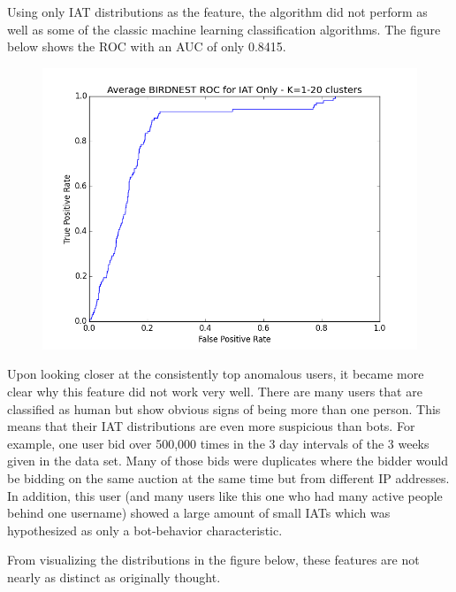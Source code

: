 \documentclass{article} %
\begin{document}
Using only IAT distributions as the feature, the algorithm did not perform as well as some of the classic machine learning classification algorithms.
The figure below shows the ROC with an AUC of only 0.8415.

\begin{figure}[h]
\centering
{\includegraphics[scale=0.47]{img/bird_iat_roc.png}}
\end{figure}

Upon looking closer at the consistently top anomalous users, it became more clear why this feature did not work very well.
There are many users that are classified as human but show obvious signs of being more than one person.
This means that their IAT distributions are even more suspicious than bots.
For example, one user bid over 500,000 times in the 3 day intervals of the 3 weeks given in the data set.
Many of those bids were duplicates where the bidder would be bidding on the same auction at the same time but from different IP addresses.
In addition, this user (and many users like this one who had many active people behind one username) showed a large amount of small IATs which was hypothesized as only a bot-behavior characteristic.

From visualizing the distributions in the figure below, these features are not nearly as distinct as originally thought.

\clearpage
\end{document}
